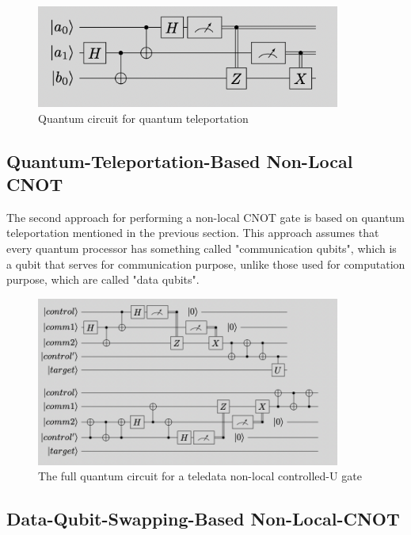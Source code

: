 	\begin{figure}[h]
  		\begin{center}
  			\includegraphics[width=10cm]{img/teleportation.png}
			\caption{Quantum circuit for quantum teleportation}
			\label{Fig2}
		\end{center}
	\end{figure}
\newpage
\subsection{Quantum-Teleportation-Based Non-Local CNOT}

 The second approach for performing a non-local CNOT gate is based on quantum teleportation mentioned in the previous section.  This approach assumes that every quantum processor has something called "communication qubits", which is a qubit that serves for communication purpose, unlike those used for computation purpose, which are called "data qubits".
 
 \begin{figure}[h]
  		\begin{center}
  			\includegraphics[width=10cm]{img/teleportation-cnot.png}
			\caption{The full quantum circuit for a teledata non-local controlled-U gate}
			\label{Fig3}
		\end{center}
	\end{figure}
	
\subsection{Data-Qubit-Swapping-Based Non-Local-CNOT}

